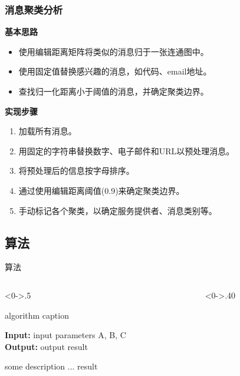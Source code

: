 \documentclass[UTF8,10pt,aspectratio=43]{ctexbeamer}
\begin{document}
\begin{frame}
\frametitle{消息聚类分析}
\begin{block}{\textbf{基本思路}}
	\begin{itemize}
		\item 使用编辑距离矩阵将类似的消息归于一张连通图中。
		\item 使用固定值替换感兴趣的消息，如代码、email地址。
		\item 查找归一化距离小于阈值的消息，并确定聚类边界。
	\end{itemize}
\end{block}

\begin{block}{\textbf{实现步骤}}
	\begin{enumerate}
		\item 加载所有消息。
		\item 用固定的字符串替换数字、电子邮件和URL以预处理消息。
		\item 将预处理后的信息按字母排序。
		\item 通过使用编辑距离阈值(0.9)来确定聚类边界。
		\item 手动标记各个聚类，以确定服务提供者、消息类别等。
	\end{enumerate}
\end{block}
\end{frame}

\subsection{算法}
\begin{frame}{算法}
\begin{columns}[T] %
   	\begin{column}<0->{.5\textwidth}
   	\begin{algorithm}[H]  
   		\caption{algorithm caption} %
   		\hspace*{0.02in} {\bf Input:} %
   		input parameters A, B, C\\
   		\hspace*{0.02in} {\bf Output:} %
   		output result 
   		\begin{algorithmic}[1] %
   		\State some description %
   		\State ...
   		\Else
   		\EndIf
   		\EndFor
   		\EndWhile
   		\State \Return result	
   		\end{algorithmic}  
   	\end{algorithm}
   	\end{column}%
   \hfill%
    \begin{column}<0->{.40\textwidth}
 
   	\end{column}%
   \end{columns}
\end{frame}
\end{document}
